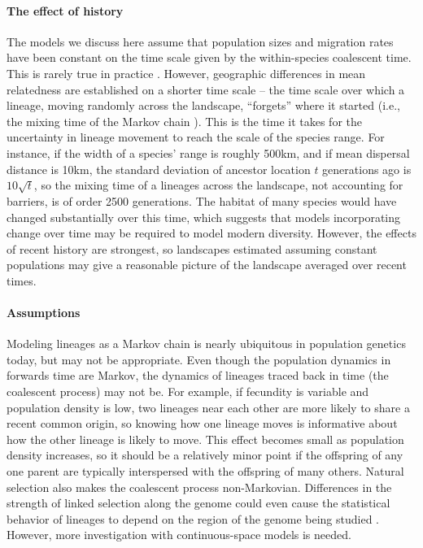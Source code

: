 \documentclass{article}
\begin{document}
\paragraph{The effect of history}
The models we discuss here assume that population sizes and migration rates
have been constant on the time scale given by the within-species coalescent time.
This is rarely true in practice \citep{neigel1991estimation,barton1995genealogies}.
However, geographic differences in mean relatedness
are established on a shorter time scale --
the time scale over which a lineage, moving randomly across the landscape,
``forgets'' where it started
(i.e., the mixing time of the Markov chain \citep{wilkins2004separationoftimescales}).
This is the time it takes for the uncertainty in lineage movement
to reach the scale of the species range.
For instance,
if the width of a species' range is roughly 500km,
and if mean dispersal distance is 10km,
the standard deviation of ancestor location $t$ generations ago is $10\sqrt{t}$,
so the mixing time of a lineages across the landscape,
not accounting for barriers, is of order 2500 generations.
The habitat of many species would have changed substantially over this time, %
which suggests that models incorporating change over time 
may be required to model modern diversity.
However, the effects of recent history are strongest,
so landscapes estimated assuming constant populations
may give a reasonable picture of the landscape averaged over recent times.


\paragraph{Assumptions}
Modeling lineages as a Markov chain is nearly ubiquitous in population genetics today,
but may not be appropriate.
Even though the population dynamics in forwards time are Markov, 
the dynamics of lineages traced back in time (the coalescent process) may not be. 
For example, if fecundity is variable and population density is low,  
two lineages near each other are more likely to share a recent common origin, 
so knowing how one lineage moves is informative about how the other lineage is likely to move. 
This effect becomes small as population density increases, 
so it should be a relatively minor point if the offspring
of any one parent are typically interspersed with the offspring of many others. 
Natural selection also makes the coalescent process non-Markovian.
Differences in the strength of linked selection along the genome
could even cause the statistical behavior of lineages to depend
on the region of the genome being studied \citep{wang2014isolation,li2016local}.
However, more investigation with continuous-space models is needed.
\end{document}
